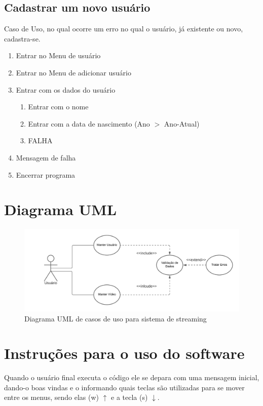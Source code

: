 \documentclass[12pt, a4paper]{article}
\begin{document}
\subsection{Cadastrar um novo usuário}
	Caso de Uso, no qual ocorre um erro no qual o usuário, já existente ou novo, cadastra-se.
\begin{enumerate}
	\item Entrar no Menu de usuário
	\item Entrar no Menu de adicionar usuário
	\item Entrar com os dados do usuário
		\begin{enumerate}
			\item Entrar com o nome
			\item Entrar com a data de nascimento (Ano $>$ Ano-Atual)
			\item FALHA
		\end{enumerate}
	\item Mensagem de falha
	\item Encerrar programa
	
\end{enumerate}

\section{Diagrama UML}
\begin{figure}[!htb]
	\centering
	\includegraphics[keepaspectratio, width=\textwidth]{DiagramaUML.png}
	\caption{\label{fig:DiagramaUML.png} Diagrama UML de casos de uso para sistema de streaming}
\end{figure}

\pagebreak
\section{Instruções para o uso do software}

Quando o usuário final executa o código ele se depara com uma mensagem inicial, dando-o boas vindas e o informando quais teclas são utilizadas para se mover entre os menus, sendo elas (w) $ \uparrow $ e a tecla (s) $ \downarrow $.
\end{document}
